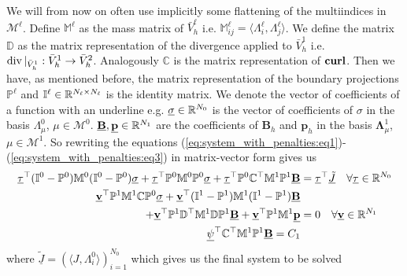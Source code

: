 \documentclass[../master_thesis.tex]{subfiles}
\begin{document}
We will from now on often use implicitly some flattening of the multiindices in $\mathcal{M}^\ell$.
Define $\mathbb{M}^\ell$ as the mass matrix 
of $\bar{V}_h^\ell$ i.e. $\mathbb{M}_{ij}^\ell = \langle \Lambda^\ell_i , \Lambda^\ell_j \rangle$.
We define the matrix $\mathbb{D}$ as the matrix representation of the 
divergence applied to $\bar{V}^1_h$ i.e. $\operatorname{div}|_{\bar{V}^1_h}: \bar{V}^1_h \rightarrow \bar{V}^2_h$.
Analogously $\mathbb{C}$ is the matrix representation of $\veccurl$. Then 
we have, as mentioned before, the matrix representation of the boundary projections 
$\mathbb{P}^\ell$ and $\mathbb{I}^\ell \in \mathbb{R}^{N_\ell \times N_\ell}$ is the identity matrix.
We denote the vector of coefficients of a function with an underline e.g. 
$\underline{\sigma} \in \mathbb{R}^{N_0}$ is the vector of coefficients of $\sigma$ in 
the basis $\Lambda^0_\mu$, $\mu \in \mathcal{M}^0$.
$\underline{\mathbf{B}}, \underline{\mathbf{p}} \in \mathbb{R}^{N_1}$ are the coefficients 
of $\mathbf{B}_h$ and $\mathbf{p}_h$ in the basis 
$\bm{\Lambda}^1_\mu$, $\mu \in \mathcal{M}^1$.
So rewriting the equations (\ref{eq:system_with_penalties:eq1})-(\ref{eq:system_with_penalties:eq3})
in matrix-vector form gives us
\begin{align*}
    \underline{\tau}^\top (\mathbb{I}^0-\mathbb{P}^0) \mathbb{M}^0 
        (\mathbb{I}^0-\mathbb{P}^0)\underline{\sigma} 
        + \underline{\tau}^\top \mathbb{P}^0 \mathbb{M}^0 \mathbb{P}^0 \underline{\sigma}
        + \underline{\tau}^\top \mathbb{P}^0 \mathbb{C} ^\top \mathbb{M}^1 \mathbb{P}^1 
        \underline{\mathbf{B}} &= \underline{\tau}^\top \underline{\tilde{J}} 
        \quad \forall \underline{\tau} \in \mathbb{R}^{N_0}
    \\ \underline{\mathbf{v}}^\top \mathbb{P}^1 \mathbb{M}^1 \mathbb{C} \mathbb{P}^0 \underline{\sigma}
        + \underline{\mathbf{v}}^\top (\mathbb{I}^1-\mathbb{P}^1) \mathbb{M}^1 
        (\mathbb{I}^1-\mathbb{P}^1)\underline{\mathbf{B}}
    \\ + \underline{\mathbf{v}}^\top \mathbb{P}^1 \mathbb{D}^\top \mathbb{M}^1 
        \mathbb{D} \mathbb{P}^1 \underline{\mathbf{B}} + \underline{\mathbf{v}}^\top \mathbb{P}^1 \mathbb{M}^1
        \underline{\mathbf{p}} &= 0 
        \quad \forall \underline{\mathbf{v}} \in \mathbb{R}^{N_1}
    \\ \underline{\psi}^\top \mathbb{C}^\top \mathbb{M}^1 \mathbb{P}^1 \underline{\mathbf{B}} = C_1
\end{align*}
where $\underline{\tilde{J}} = (\langle J, \Lambda^0_i \rangle)_{i=1}^{N_0}$
which gives us the final system to be solved 
\end{document}
